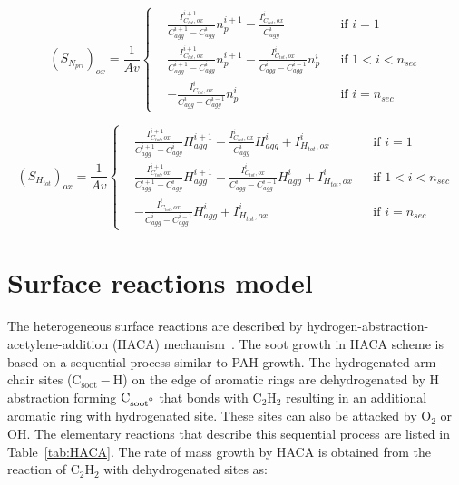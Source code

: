 \begin{equation}
	\left(S_{N_{pri}}\right)_{ox}=
	\frac{1}{Av}
	\left\{
	\begin{aligned}
		&\frac{I^{i+1}_{C_{tot},ox}}{C^{i+1}_{agg}-C^{i}_{agg}}n^{i+1}_p
		-
		\frac{I^{i}_{C_{tot},ox}}{C^{i}_{agg}}
		&&
		\text{if } i = 1
		\\
		&\frac{I^{i+1}_{C_{tot},ox}}{C^{i+1}_{agg}-C^{i}_{agg}}n^{i+1}_p
		-
		\frac{I^{i}_{C_{tot},ox}}{C^{i}_{agg}-C^{i-1}_{agg}}n^{i}_p
		&&
		\text{if } 1 < i < n_{sec}
		\\
		&
		-
		\frac{I^{i}_{C_{tot},ox}}{C^{i}_{agg}-C^{i-1}_{agg}}n^{i}_p
		&&\text{if } i=n_{sec}
	\end{aligned}
	\right.
	\label{eqn:S_Npri_oxsect}
\end{equation}

\begin{equation}
	\left(S_{H_{tot}}\right)_{ox}=
	\frac{1}{Av}
	\left\{
	\begin{aligned}
		&\frac{I^{i+1}_{C_{tot},ox}}{C^{i+1}_{agg}-C^{i}_{agg}}H^{i+1}_{agg}
		-
		\frac{I^{i}_{C_{tot},ox}}{C^{i}_{agg}}H^{i}_{agg}
		+ I^{i}_{H_{tot}, ox}
		&&
		\text{if } i = 1
		\\
		&\frac{I^{i+1}_{C_{tot},ox}}{C^{i+1}_{agg}-C^{i}_{agg}}H^{i+1}_{agg}
		-
		\frac{I^{i}_{C_{tot},ox}}{C^{i}_{agg}-C^{i-1}_{agg}}H^{i}_{agg}
		+ I^{i}_{H_{tot}, ox}
		&&
		\text{if } 1 < i < n_{sec}
		\\
		&
		-
		\frac{I^{i}_{C_{tot},ox}}{C^{i}_{agg}-C^{i-1}_{agg}}H^{i}_{agg}
		+ I^{i}_{H_{tot}, ox}
		&&\text{if } i=n_{sec}
	\end{aligned}
	\right.
	\label{eqn:S_Htot_oxsect}
\end{equation}

\section{Surface reactions model}
\label{sec:surfreacmodel}
The heterogeneous surface reactions are described by hydrogen-abstraction-acetylene-addition (HACA) mechanism~\citep{frenklach1991detailed, appel2000kinetic}. The soot growth in HACA scheme is based on a sequential process similar to PAH growth. The hydrogenated arm-chair sites ($\mathrm{C_{soot}-H}$) on the edge of aromatic rings are dehydrogenated by H abstraction forming $\mathrm{C_{soot\mbox{\textdegree}}}$ that bonds with $\mathrm{C_2H_2}$ resulting in an additional aromatic ring with hydrogenated site. These sites can also be attacked by $\mathrm{O_2}$ or $\mathrm{OH}$. The elementary reactions that describe this sequential process are listed in Table~\ref{tab:HACA}.
The rate of mass growth by HACA is obtained from the reaction of $\mathrm{C_2H_2}$ with dehydrogenated sites as:

